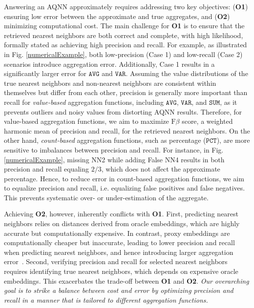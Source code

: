  Answering an AQNN approximately requires addressing two key objectives: (\textbf{O1}) ensuring low error between the approximate and true aggregates, and (\textbf{O2}) minimizing computational cost. 
The main challenge for \textbf{O1} is to ensure that the retrieved nearest neighbors are both correct and complete, with high likelihood, formally stated as achieving high precision and recall. For example, as illustrated in Fig. \ref{numericalExample}, both low-precision (Case 1) and low-recall (Case 2) scenarios introduce aggregation error. Additionally, Case 1 results in a significantly larger error for \(\mathtt{AVG}\) and \(\mathtt{VAR}\). Assuming the value distributions of the true nearest neighbors and non-nearest neighbors are consistent within themselves but differ from each other, precision is generally more important than recall for \textit{value-based} aggregation functions, including \(\mathtt{AVG}\), \(\mathtt{VAR}\), and \(\mathtt{SUM}\), as it prevents outliers and noisy values from distorting AQNN results. Therefore, for value-based aggregation functions, we aim to maximize \(\text{F}{\beta}\) score, a weighted harmonic mean of precision and recall, for the retrieved nearest neighbors.
On the other hand, \textit{count-based} aggregation functions, such as percentage (\(\mathtt{PCT}\)), are more sensitive to imbalances between precision and recall. For instance, in Fig. \ref{numericalExample}, missing NN2 while adding False NN4 results in both precision and recall equaling \(2/3\), which does not affect the approximate percentage. Hence, to reduce error in count-based aggregation functions, we aim to equalize precision and recall, i.e. equalizing false positives and false negatives. This prevents systematic over- or under-estimation of the aggregate.

Achieving \textbf{O2}, however, inherently conflicts with \textbf{O1}. First, predicting nearest neighbors relies on distances derived from oracle embeddings, which are highly accurate but computationally expensive. In contrast, proxy embeddings are computationally cheaper but inaccurate, leading to lower precision and recall when predicting nearest neighbors, and hence introducing larger aggregation error~\cite{DBLP:conf/icde/AndersonCRW19, DBLP:conf/sigmod/LuCKC18, DujianPQA, kang2017noscope}. Second, verifying precision and recall for selected nearest neighbors requires identifying true nearest neighbors, which depends on expensive oracle embeddings. This exacerbates the trade-off between \textbf{O1} and \textbf{O2}.
{\em Our overarching goal is to strike a balance between cost and error by optimizing precision and recall in a manner that is tailored to different aggregation functions.}\\


